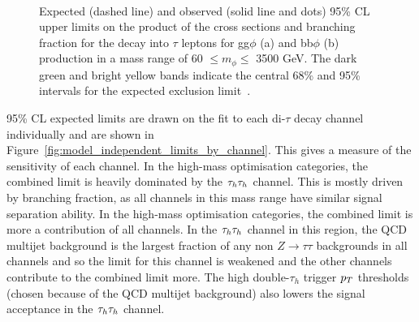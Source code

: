\begin{figure}[!hbtp]
\centering
     \\
\caption{Expected (dashed line) and observed (solid line and dots) 95\% CL upper limits on the product of the cross sections and branching fraction for the decay into $\tau$ leptons for gg$\phi$ (a) and bb$\phi$ (b) production in a mass range of 60 $\leq m_{\phi} \leq$ 3500 GeV.  The dark green and bright yellow bands indicate the central 68\% and 95\% intervals for the expected exclusion limit~\cite{CMS:2022rbd}.}
\label{fig:model_independent_limits}
\end{figure}

95\% \ac{CL} expected limits are drawn on the fit to each di-$\tau$ decay channel individually and are shown in Figure~\ref{fig:model_independent_limits_by_channel}.
This gives a measure of the sensitivity of each channel.
In the high-mass optimisation categories, the combined limit is heavily dominated by the $\tau_{h}\tau_{h}$ channel.
This is mostly driven by branching fraction, as all channels in this mass range have similar signal separation ability.
In the high-mass optimisation categories, the combined limit is more a contribution of all channels. 
In the $\tau_{h}\tau_{h}$ channel in this region, the \ac{QCD} multijet background is the largest fraction of any non $Z\rightarrow\tau\tau$ backgrounds in all channels and so the limit for this channel is weakened and the other channels contribute to the combined limit more.
The high double-$\tau_h$ trigger $p_{T}$ thresholds (chosen because of the \ac{QCD} multijet background) also lowers the signal acceptance in the $\tau_{h}\tau_{h}$ channel. \\

